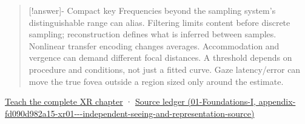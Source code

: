 \begin{quote}
{[}!answer{]}- Compact key Frequencies beyond the sampling system's distinguishable range can alias. Filtering limits content before discrete sampling; reconstruction defines what is inferred between samples. Nonlinear transfer encoding changes averages. Accommodation and vergence can demand different focal distances. A threshold depends on procedure and conditions, not just a fitted curve. Gaze latency/error can move the true fovea outside a region sized only around the estimate.
\end{quote}

\href{Continuous\%20Notes/University\%20-\%20Worlds,\%20Images\%20and\%20Inference\%20-\%20Graphics,\%20Vision\%20and\%20Photography\#Sampling\%20is\%20a\%20question\%20of\%20what\%20remains\%20distinguishable}{Teach the complete XR chapter} · \href{../01-Foundations-I/main.pdf\#nameddest=appendix-fd090d982a15-xr01---independent-seeing-and-representation-source}{Source ledger (01-Foundations-I, appendix-fd090d982a15-xr01-\/-\/-independent-seeing-and-representation-source)}
